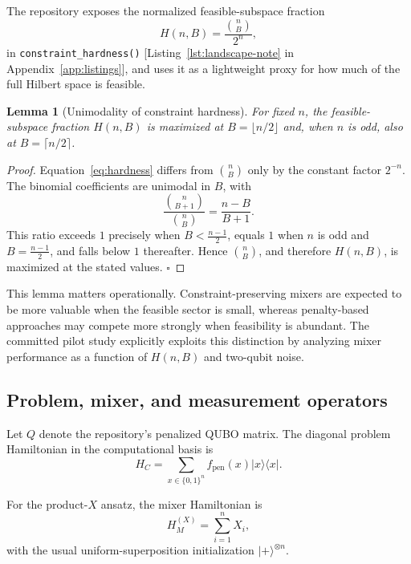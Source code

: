 \documentclass[11pt]{article}
\newtheorem{lemma}{Lemma}
\begin{document}
The repository exposes the normalized feasible-subspace fraction
\begin{equation}
H(n,B)=\frac{\binom{n}{B}}{2^n},
\label{eq:hardness}
\end{equation}
in \texttt{constraint\_hardness()} [Listing~\ref{lst:landscape-note} in Appendix~\ref{app:listings}], and uses it as a lightweight proxy for how much of the full Hilbert space is feasible.

\begin{lemma}[Unimodality of constraint hardness]
For fixed \(n\), the feasible-subspace fraction \(H(n,B)\) is maximized at \(B=\lfloor n/2 \rfloor\) and, when \(n\) is odd, also at \(B=\lceil n/2 \rceil\).
\end{lemma}

\begin{proof}
Equation~\eqref{eq:hardness} differs from \(\binom{n}{B}\) only by the constant factor \(2^{-n}\). The binomial coefficients are unimodal in \(B\), with
\[
\frac{\binom{n}{B+1}}{\binom{n}{B}}=\frac{n-B}{B+1}.
\]
This ratio exceeds \(1\) precisely when \(B<\frac{n-1}{2}\), equals \(1\) when \(n\) is odd and \(B=\frac{n-1}{2}\), and falls below \(1\) thereafter. Hence \(\binom{n}{B}\), and therefore \(H(n,B)\), is maximized at the stated values. \(\square\)
\end{proof}

This lemma matters operationally. Constraint-preserving mixers are expected to be more valuable when the feasible sector is small, whereas penalty-based approaches may compete more strongly when feasibility is abundant. The committed pilot study explicitly exploits this distinction by analyzing mixer performance as a function of \(H(n,B)\) and two-qubit noise.

\subsection{Problem, mixer, and measurement operators}

Let \(Q\) denote the repository's penalized QUBO matrix. The diagonal problem Hamiltonian in the computational basis is
\begin{equation}
H_C = \sum_{x \in \{0,1\}^n} f_{\mathrm{pen}}(x) |x\rangle\langle x|.
\label{eq:costham}
\end{equation}

For the \(\mathrm{product}\text{-}X\) ansatz, the mixer Hamiltonian is
\begin{equation}
H_M^{(X)} = \sum_{i=1}^n X_i,
\label{eq:productxmixer}
\end{equation}
with the usual uniform-superposition initialization \(|+\rangle^{\otimes n}\).
\end{document}
